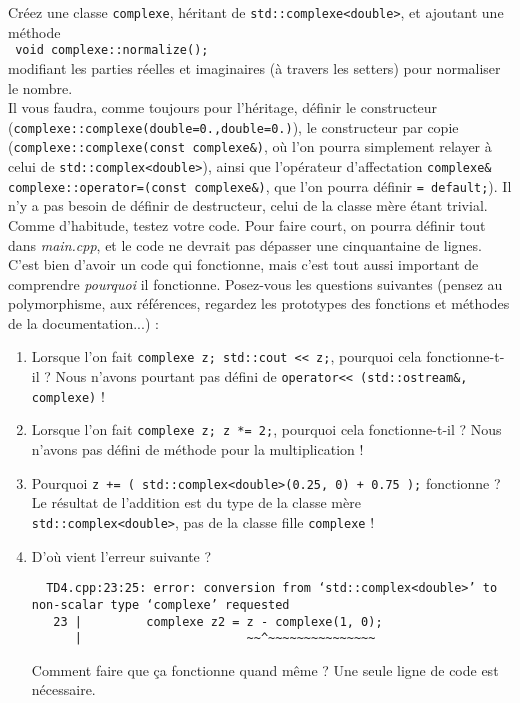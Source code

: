 \documentclass{book}
\newcommand{\inline}[1]{\texttt{#1}}
\def\filename{\emph}
\begin{document}
Créez une classe \inline{complexe}, héritant de \inline{std::complexe<double>}, et ajoutant une méthode\\
\inline{  void complexe::normalize();}\\
modifiant les parties réelles et imaginaires (à travers les setters) pour normaliser le nombre.\\

Il vous faudra, comme toujours pour l'héritage, définir le constructeur (\inline{complexe::complexe(double=0.,double=0.)}), le constructeur par copie (\inline{complexe::complexe(const complexe&)}, où l'on pourra simplement relayer à celui de \inline{std::complex<double>}), ainsi que l'opérateur d'affectation \inline{complexe& complexe::operator=(const complexe&)}, que l'on pourra définir \inline{= default;}). Il n'y a pas besoin de définir de destructeur, celui de la classe mère étant trivial. Comme d'habitude, testez votre code. Pour faire court, on pourra définir tout dans \filename{main.cpp}, et le code ne devrait pas dépasser une cinquantaine de lignes.\\

C'est bien d'avoir un code qui fonctionne, mais c'est tout aussi important de comprendre \emph{pourquoi} il fonctionne. Posez-vous les questions suivantes (pensez au polymorphisme, aux références, regardez les prototypes des fonctions et méthodes de la documentation...) :
\begin{enumerate}

  \item Lorsque l'on fait \inline{complexe z; std::cout << z;}, pourquoi cela fonctionne-t-il ? Nous n'avons pourtant pas défini de \inline{operator<< (std::ostream&, complexe)} !

  \item Lorsque l'on fait \inline{complexe z; z *= 2;}, pourquoi cela fonctionne-t-il ? Nous n'avons pas défini de méthode pour la multiplication !

  \item Pourquoi \inline{z += ( std::complex<double>(0.25, 0) + 0.75 );} fonctionne ? Le résultat de l'addition est du type de la classe mère \inline{std::complex<double>}, pas de la classe fille \inline{complexe} !

  \item D'où vient l'erreur suivante ?
\begin{verbatim}
  TD4.cpp:23:25: error: conversion from ‘std::complex<double>’ to non-scalar type ‘complexe’ requested
   23 |         complexe z2 = z - complexe(1, 0);
      |                       ~~^~~~~~~~~~~~~~~~
\end{verbatim}
  Comment faire que ça fonctionne quand même ? Une seule ligne de code est nécessaire.

\end{enumerate}
\end{document}
